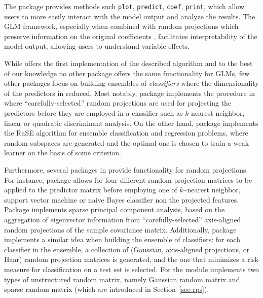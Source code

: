 \documentclass[
  article]{jss}
\begin{document}
The package provides methods such \texttt{plot}, \texttt{predict},
\texttt{coef}, \texttt{print}, which allow users to more easily interact
with the model output and analyze the results. The GLM framework,
especially when combined with random projections which preserve
information on the original coefficients \citep[such as the one
in][]{parzer2024glms}, facilitates interpretability of the model output,
allowing users to understand variable effects.

While  offers the first implementation of the described
algorithm and to the best of our knowledge no other package offers the
same functionality for GLMs, few other  packages focus on
building ensembles of \emph{classifiers} where the dimensionality of the
predictors in reduced. Most notably, package 
\citep{RPEnsembleR} implements the procedure in
\citet{cannings2017random} where ``carefully-selected'' random
projections are used for projecting the predictors before they are
employed in a classifier such as \(k\)-nearest neighbor, linear or
quadratic discriminant analysis. On the other hand, package 
\citep{pkg:RaSEn} implements the RaSE algorithm for ensemble
classification and regression problems, where random subspaces are
generated and the optimal one is chosen to train a weak learner on the
basis of some criterion.

Furthermore, several packages in  provide functionality for
random projections. For instance, package 
\citep{RandProR, SIDDHARTH2020100629} allows for four different random
projection matrices to be applied to the predictor matrix before
employing one of \(k\)\textasciitilde nearest neighbor, support vector
machine or naive Bayes classifier non the projected features. Package
 \citep{SPCAvRPR} implements sparse principal component
analysis, based on the aggregation of eigenvector information from
``carefully-selected'' axis-aligned random projections of the sample
covariance matrix. Additionally, package 
\citep{RPEnsembleR} implements a similar idea when building the ensemble
of classifiers: for each classifier in the ensemble, a collection of
(Gaussian, axis-aligned projections, or Haar) random projection matrices
is generated, and the one that minimizes a risk measure for
classification on a test set is selected. For 
\citep{Python} the  module
\citep{pedregosa2011scikit} implements two types of unstructured random
matrix, namely Gaussian random matrix and sparse random matrix (which
are introduced in Section~\ref{sec-rps}).
\end{document}

